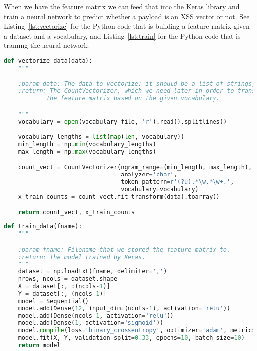 \documentclass[10pt,journal,compsoc]{IEEEtran}
\begin{document}
When we have the feature matrix we can feed that into the Keras library and train a neural network to predict whether
a payload is an XSS vector or not. See Listing~\ref{lst:vectorize} for the Python code that is building a feature matrix
given a dataset and a vocabulary, and Listing~\ref{lst:train} for the Python code that is training the neural network.


\begin{lstlisting}[language=Python, caption={Python function that builds the feature matrix based on the dataset.},
                    label={lst:vectorize}]
def vectorize_data(data):
    """

    :param data: The data to vectorize; it should be a list of strings, one per line.
    :return: The CountVectorizer, which we need later in order to transform incoming requests to a feature vector
            The feature matrix based on the given vocabulary.

    """
    vocabulary = open(vocabulary_file, 'r').read().splitlines()

    vocabulary_lengths = list(map(len, vocabulary))
    min_length = np.min(vocabulary_lengths)
    max_length = np.max(vocabulary_lengths)

    count_vect = CountVectorizer(ngram_range=(min_length, max_length),
                                 analyzer='char',
                                 token_pattern=r'(?u).*\w.*\w+.',
                                 vocabulary=vocabulary)
    x_train_counts = count_vect.fit_transform(data).toarray()

    return count_vect, x_train_counts

\end{lstlisting}


\begin{lstlisting}[language=Python, caption={The Python function that builds a neural network and
                                                trains it using the feature matrix},
                    label={lst:train}]
def train_data(fname):
    """

    :param fname: Filename that we stored the feature matrix to.
    :return: The model trained by Keras.
    """
    dataset = np.loadtxt(fname, delimiter=',')
    nrows, ncols = dataset.shape
    X = dataset[:, :(ncols-1)]
    Y = dataset[:, (ncols-1)]
    model = Sequential()
    model.add(Dense(12, input_dim=(ncols-1), activation='relu'))
    model.add(Dense(ncols-1, activation='relu'))
    model.add(Dense(1, activation='sigmoid'))
    model.compile(loss='binary_crossentropy', optimizer='adam', metrics=['accuracy'])
    model.fit(X, Y, validation_split=0.33, epochs=10, batch_size=10)
    return model

\end{lstlisting}
\end{document}
